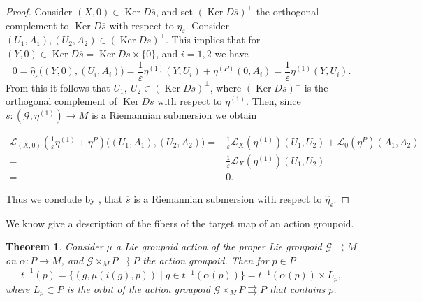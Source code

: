 \documentclass[12pt,a4paper,reqno]{amsart}
\DeclareMathOperator{\kernel}{Ker}
\newcommand{\1}{\mathbbm{1}} %
\newcommand{\G}{\mathcal{G}} %
\newcommand{\Lie}{\mathcal{L}} %
\newtheorem{thm}{Theorem}[section]
\theoremstyle{definition}
\theoremstyle{TheoremNum}
\begin{document}
\begin{proof}
Consider $(X,0)\in \kernel D\overline{s}$, and set $(\kernel D\overline{s})^\perp$ the orthogonal complement to $\kernel D\overline{s}$ with respect to $\eta_\varepsilon$. Consider $(U_1,A_1),(U_2,A_2)\in (\kernel D\overline{s})^\perp$. This implies that for $(Y,0)\in \kernel D\overline{s} = \kernel Ds\times \{0\}$, and $i=1,2$ we have
\[
0 = \widehat{\eta}_\varepsilon \big((Y,0),(U_i,A_i)\big) = \frac{1}{\varepsilon}\eta^{(1)}(Y,U_i)+\eta^{(P)}(0,A_i) = \frac{1}{\varepsilon}\eta^{(1)}(Y,U_i).
\]
From this it follows that $U_1,\: U_2\in (\kernel Ds)^\perp$, where $(\kernel Ds)^\perp$ is the orthogonal complement of $\kernel Ds$ with respect to $\eta^{(1)}$. Then, since $s\colon (\G,\eta^{(1)})\to M$ is a Riemannian submersion we obtain
\begin{linenomath}
\begin{align*}
\Lie_{(X,0)}\left(\frac{1}{\varepsilon}\eta^{(1)}+\eta^P\right )\big((U_1,A_1),(U_2,A_2)\big) =& \frac{1}{\varepsilon}\Lie_{X}(\eta^{(1)})(U_1,U_2)+\Lie_0(\eta^P)(A_1,A_2)\\
=&\frac{1}{\varepsilon}\Lie_{X}(\eta^{(1)})(U_1,U_2)\\
=&0.
\end{align*}
\end{linenomath}
Thus we conclude by \cite[Theorem~1.2.1]{GromollWalschap}, that $\overline{s}$ is a Riemannian submersion with respect to $\widehat{\eta}_\varepsilon$. 
\end{proof}

We know give a description of the fibers of the target map of an action groupoid.

\begin{thm}
Consider $\mu$ a Lie groupoid action of the proper Lie groupoid $\G\rightrightarrows M$ on $\alpha\colon P\to M$, and $\G\times_M P\rightrightarrows P$ the action groupoid. Then for $p\in P$
\[
\overline{t}^{-1}(p) = \{(g,\mu(i(g),p))\mid g\in t^{-1}(\alpha(p))\} = t^{-1}(\alpha(p))\times L_p,
\]
where $L_p\subset P$ is the orbit of the action groupoid $\G\times_M P\rightrightarrows P$ that contains $p$.
\end{thm}
\end{document}
